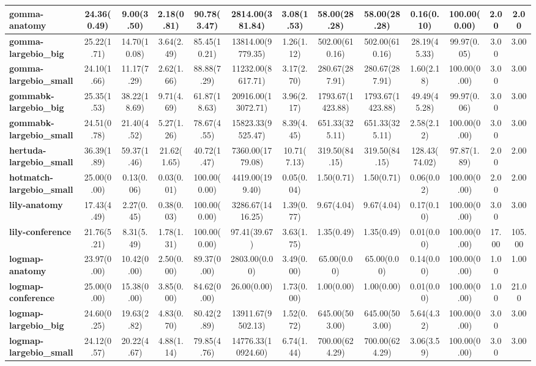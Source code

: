 \begin{tabular}{|l|c|c|c|c|c|c|c|c|c|c|c|c|}
\textbf{gomma-anatomy}&24.36(0.49)&9.00(3.50)&2.18(0.81)&90.78(3.47)&2814.00(381.84)&3.08(1.53)&58.00(28.28)&58.00(28.28)&0.16(0.10)&100.00(0.00)&2.00&2.00\\\hline
\textbf{gomma-largebio\_big}&25.22(1.71)&14.70(10.08)&3.64(2.49)&85.45(10.21)&13814.00(9779.35)&1.26(1.12)&502.00(610.16)&502.00(610.16)&28.19(45.33)&99.97(0.05)&3.00&3.00\\\hline
\textbf{gomma-largebio\_small}&24.10(1.66)&11.17(7.29)&2.62(1.66)&88.88(7.29)&11232.00(8617.71)&3.17(2.70)&280.67(287.91)&280.67(287.91)&1.60(2.18)&100.00(0.00)&3.00&3.00\\\hline
\textbf{gommabk-largebio\_big}&25.35(1.53)&38.22(18.69)&9.71(4.69)&61.87(18.63)&20916.00(13072.71)&3.96(2.17)&1793.67(1423.88)&1793.67(1423.88)&49.49(45.28)&99.97(0.06)&3.00&3.00\\\hline
\textbf{gommabk-largebio\_small}&24.51(0.78)&21.40(4.52)&5.27(1.26)&78.67(4.55)&15823.33(9525.47)&8.39(4.45)&651.33(325.11)&651.33(325.11)&2.58(2.12)&100.00(0.00)&3.00&3.00\\\hline
\textbf{hertuda-largebio\_small}&36.39(1.89)&59.37(1.46)&21.62(1.65)&40.72(1.47)&7360.00(1779.08)&10.71(7.13)&319.50(84.15)&319.50(84.15)&128.43(74.02)&97.87(1.89)&2.00&2.00\\\hline
\textbf{hotmatch-largebio\_small}&25.00(0.00)&0.13(0.06)&0.03(0.01)&100.00(0.00)&4419.00(199.40)&0.05(0.04)&1.50(0.71)&1.50(0.71)&0.06(0.02)&100.00(0.00)&2.00&2.00\\\hline
\textbf{lily-anatomy}&17.43(4.49)&2.27(0.45)&0.38(0.03)&100.00(0.00)&3286.67(1416.25)&1.39(0.77)&9.67(4.04)&9.67(4.04)&0.17(0.10)&100.00(0.00)&3.00&3.00\\\hline
\textbf{lily-conference}&21.76(5.21)&8.31(5.49)&1.78(1.31)&100.00(0.00)&97.41(39.67)&3.63(1.75)&1.35(0.49)&1.35(0.49)&0.01(0.00)&100.00(0.00)&17.00&105.00\\\hline
\textbf{logmap-anatomy}&23.97(0.00)&10.42(0.00)&2.50(0.00)&89.37(0.00)&2803.00(0.00)&3.49(0.00)&65.00(0.00)&65.00(0.00)&0.14(0.00)&100.00(0.00)&1.00&1.00\\\hline
\textbf{logmap-conference}&25.00(0.00)&15.38(0.00)&3.85(0.00)&84.62(0.00)&26.00(0.00)&1.73(0.00)&1.00(0.00)&1.00(0.00)&0.01(0.00)&100.00(0.00)&1.00&21.00\\\hline
\textbf{logmap-largebio\_big}&24.60(0.25)&19.63(2.82)&4.83(0.70)&80.42(2.89)&13911.67(9502.13)&1.52(0.72)&645.00(503.00)&645.00(503.00)&5.64(4.32)&100.00(0.00)&3.00&3.00\\\hline
\textbf{logmap-largebio\_small}&24.12(0.57)&20.22(4.67)&4.88(1.14)&79.85(4.76)&14776.33(10924.60)&6.74(1.44)&700.00(624.29)&700.00(624.29)&3.06(3.59)&100.00(0.00)&3.00&3.00\\\hline

\end{tabular}
